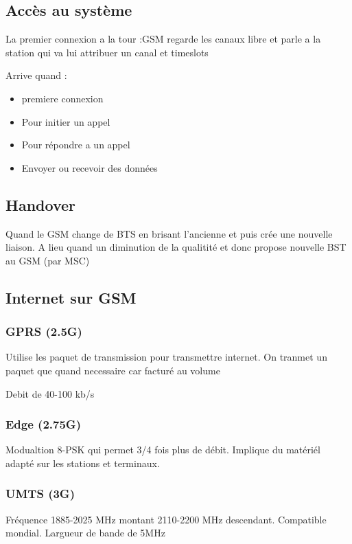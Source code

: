 \documentclass[12pt]{article}
\begin{document}
 	\subsection{Accès au système}
 	
 		La premier connexion a la tour :GSM regarde les canaux libre et parle a la station qui va lui attribuer un canal et timeslots
 		
 		Arrive quand :
 		\begin{itemize}
 			\item premiere connexion
 			\item Pour initier un appel
 			\item Pour répondre a un appel
 			\item Envoyer ou recevoir des données
 		\end{itemize}
 		
 	\subsection{Handover}
 		Quand le GSM change de BTS en brisant l'ancienne et puis crée une nouvelle liaison. A lieu quand  un diminution de la qualitité et donc propose nouvelle BST au GSM (par MSC) 
 		
 	\subsection{Internet sur GSM}
 		\subsubsection{GPRS (2.5G)}
 			Utilise les paquet de transmission pour transmettre internet. On tranmet un paquet que quand necessaire car facturé au volume
 			
 			Debit de 40-100 kb/s
 			
 		\subsubsection{Edge (2.75G)}
 			Modualtion 8-PSK qui permet 3/4 fois plus de débit. Implique du matériél adapté sur les stations et terminaux.
 			
 		\subsubsection{UMTS (3G)}
 			Fréquence 1885-2025 MHz montant 2110-2200 MHz descendant. Compatible mondial. Largueur de bande de 5MHz
 			
\end{document}
